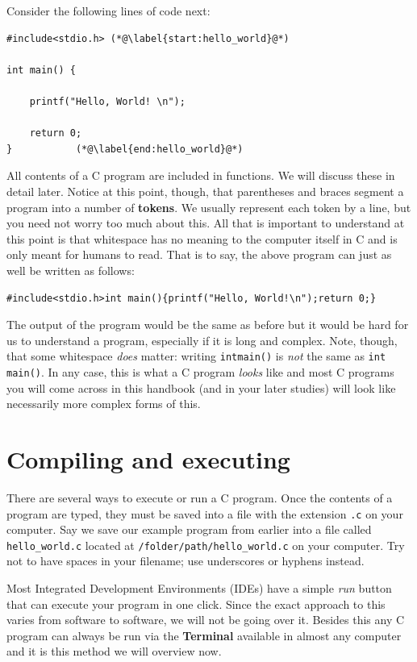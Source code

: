 \documentclass[11pt,oneside]{article}
\begin{document}
Consider the following lines of code next:

\begin{lstlisting}
#include<stdio.h> (*@\label{start:hello_world}@*)

int main() {

	printf("Hello, World! \n");
	
	return 0;
}			(*@\label{end:hello_world}@*)
\end{lstlisting}

All contents of a C program are included in functions. We will discuss these in detail later. Notice at this point, though, that parentheses and braces segment a program into a number of \textbf{tokens}. We usually represent each token by a line, but you need not worry too much about this. All that is important to understand at this point is that whitespace has no meaning to the computer itself in C and is only meant for humans to read. That is to say, the above program can just as well be written as follows:

\begin{lstlisting}
#include<stdio.h>int main(){printf("Hello, World!\n");return 0;}
\end{lstlisting}

The output of the program would be the same as before but it would be hard for us to understand a program, especially if it is long and complex. Note, though, that some whitespace \textit{does} matter: writing \verb+intmain()+ is \textit{not} the same as \verb+int main()+. In any case, this is what a C program \textit{looks} like and most C programs you will come across in this handbook (and in your later studies) will look like necessarily more complex forms of this.

\section{Compiling and executing}

There are several ways to execute or run a C program. Once the contents of a program are typed, they must be saved into a file with the extension \verb+.c+ on your computer. Say we save our example program from earlier into a file called \verb+hello_world.c+ located at \verb+/folder/path/hello_world.c+ on your computer. Try not to have spaces in your filename; use underscores or hyphens instead.

Most Integrated Development Environments (IDEs) have a simple \textit{run} button that can execute your program in one click. Since the exact approach to this varies from software to software, we will not be going over it. Besides this any C program can always be run via the \textbf{Terminal} available in almost any computer and it is this method we will overview now.\\
\end{document}
